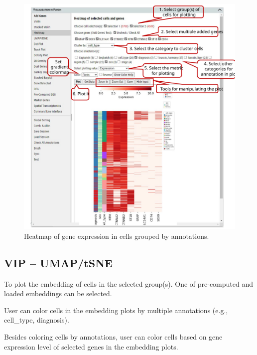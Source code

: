 \documentclass[
]{article}
\begin{document}
\begin{figure}
\centering
\includegraphics{figures/F9_label.svg}
\caption{Heatmap of gene expression in cells grouped by annotations.}
\end{figure}

\hypertarget{vip-umaptsne}{%
\subsection{VIP -- UMAP/tSNE}\label{vip-umaptsne}}

To plot the embedding of cells in the selected group(s). One of pre-computed and loaded embeddings can be selected.

User can color cells in the embedding plots by multiple annotations (e.g., cell\_type, diagnosis).

Besides coloring cells by annotations, user can color cells based on gene expression level of selected genes in the embedding plots.
\end{document}
